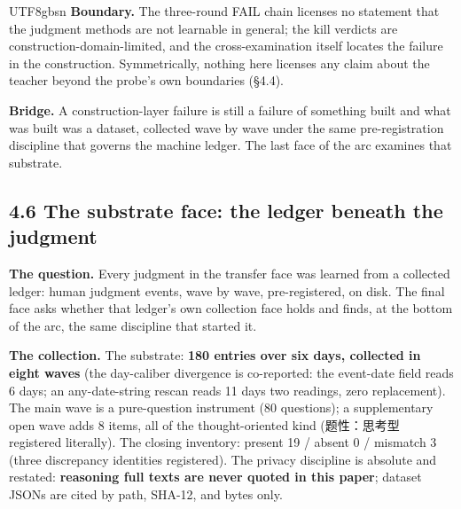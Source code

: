 \documentclass[11pt,letterpaper]{article}
\begin{document}
\begin{CJK}{UTF8}{gbsn}
\textbf{Boundary.} The three-round FAIL chain licenses no statement that the judgment methods are not learnable in general; the kill verdicts are construction-domain-limited, and the cross-examination itself locates the failure in the construction. Symmetrically, nothing here licenses any claim about the teacher beyond the probe's own boundaries (\S{}4.4).

\textbf{Bridge.} A construction-layer failure is still a failure of something built \textemdash{} and what was built was a dataset, collected wave by wave under the same pre-registration discipline that governs the machine ledger. The last face of the arc examines that substrate.

\subsection*{4.6 The substrate face: the ledger beneath the judgment}

\textbf{The question.} Every judgment in the transfer face was learned from a collected ledger: human judgment events, wave by wave, pre-registered, on disk. The final face asks whether that ledger's own collection face holds \textemdash{} and finds, at the bottom of the arc, the same discipline that started it.

\textbf{The collection.} The substrate: \textbf{180 entries over six days, collected in eight waves} (the day-caliber divergence is co-reported: the event-date field reads 6 days; an any-date-string rescan reads 11 days \textemdash{} two readings, zero replacement). The main wave is a pure-question instrument (80 questions); a supplementary open wave adds 8 items, all of the thought-oriented kind (题性：思考型 \textemdash{} registered literally). The closing inventory: present 19 / absent 0 / mismatch 3 (three discrepancy identities registered). The privacy discipline is absolute and restated: \textbf{reasoning full texts are never quoted in this paper}; dataset JSONs are cited by path, SHA-12, and bytes only.


\end{CJK}
\end{document}
